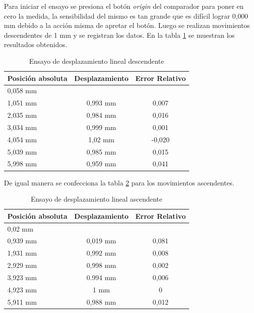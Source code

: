 Para iniciar el ensayo se presiona el botón \textit{origin} del comparador para poner en cero la medida, la sensibilidad del mismo es tan grande que es difícil lograr 0,000 mm debido a la acción misma  de apretar el botón. Luego se realizan movimientos descendentes de 1 mm y se registran los datos.
En la tabla \ref{tab:ensayo_desplazamiento_des} se muestran los resultados obtenidos.

\begin{table}[h!]
	\centering
	\caption[Ensayo de desplazamiento descendente]{Ensayo de desplazamiento lineal descendente}
	\begin{tabular}{l c c }    
		\toprule
		\textbf{Posición absoluta}     & \textbf{Desplazamiento} & \textbf{Error Relativo} \\
		\midrule
		0,058 mm	& 	        	& 	 			 	\\		
		1,051 mm    & 	0,993 mm    	& 	0,007				\\
		2,035 mm 	& 	0,984 mm	    & 	0,016 				\\
		3,034 mm	& 	0,999 mm	    & 	0,001 			\\
		4,054 mm 	& 	1,02 mm         & 	-0,020					\\
		5,039 mm 	& 	0,985 mm	    & 	0,015					\\
		5,998 mm 	& 	0,959 mm        & 	0,041 			\\
		\bottomrule
		\hline
	\end{tabular}
	\label{tab:ensayo_desplazamiento_des}
\end{table}

De igual manera se confecciona la tabla \ref{tab:ensayo_desplazamiento_asc} para los movimientos ascendentes.
 
\begin{table}[h!]
	\centering
	\caption[Ensayo de desplazamiento ascendente]{Ensayo de desplazamiento lineal ascendente}
	\begin{tabular}{l c c }    
		\toprule
		\textbf{Posición absoluta}     & \textbf{Desplazamiento} & \textbf{Error Relativo} \\
		\midrule
		0,02 mm	& 	        	& 	 			 	\\		
		0,939 mm    & 	0,019 mm    	& 	0,081	\\
		1,931 mm 	& 	0,992 mm	    & 	0,008 	\\
		2,929 mm	& 	0,998 mm	    & 	0,002 	\\
		3,923 mm 	& 	0.994 mm        & 	0,006	\\
		4,923 mm 	& 	1 mm	    	& 	0		\\
		5,911 mm 	& 	0,988 mm        & 	0,012 	\\
		\bottomrule
		\hline
	\end{tabular}
	\label{tab:ensayo_desplazamiento_asc}
\end{table}


